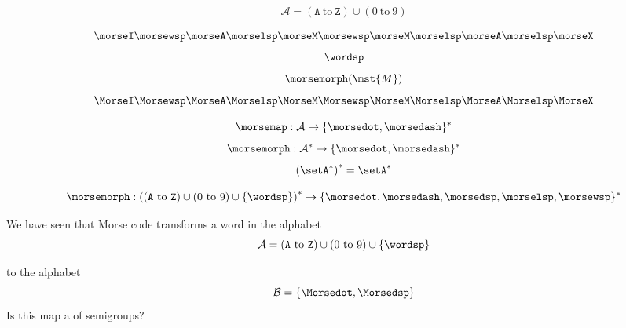 \begin{forslides}
\begin{equation} \label{eq:morse-alphabet-0}
\mathcal{A} = (\texttt{A} \ \text{to}\ \texttt{Z}) \cup (0 \ \text{to}\ 9)
\end{equation}

\begin{equation}\label{eq:IAMMAX}
      \morseI \morsewsp \morseA \morselsp \morseM \morsewsp \morseM \morselsp \morseA \morselsp \morseX
  \end{equation}
\begin{equation}\label{eq:wordsp}
      \wordsp
  \end{equation}
\begin{equation}\label{eq:morsem}
      \morsemorph(\mst{M})
  \end{equation}
\begin{equation}\label{eq:IAMMAXsignal}
      \MorseI \Morsewsp \MorseA \Morselsp \MorseM \Morsewsp \MorseM \Morselsp \MorseA \Morselsp \MorseX
  \end{equation}


\begin{equation} \label{eq:morsemap}
\morsemap : \mathcal{A} \to  \{\morsedot, \morsedash\}^*
\end{equation}
\begin{equation} \label{eq:morsemorph}
\morsemorph : \mathcal{A}^* \to   \{\morsedot, \morsedash\}^*
\end{equation}
\begin{equation} \label{eq:moresemapnote}
\left(\setA^*\right)^*= \setA^*
\end{equation}


\begin{equation} \label{eq:morsemorph2}
\morsemorph :
 \left(
(\texttt{A} \ \text{to}\ \texttt{Z}) \cup (0 \ \text{to}\ 9) \cup \{\wordsp\}
\right)^*
 \to   \{ \morsedot,  \morsedash,  \morsedsp,  \morselsp, \morsewsp \}^*
\end{equation}



\end{forslides}
\begin{exercise}
We have seen that Morse code transforms a word in the alphabet
\begin{equation} \label{eq:morse-alphabet-ext}
\mathcal{A} = (\texttt{A} \ \text{to}\ \texttt{Z}) \cup (0 \ \text{to}\ 9) \cup \{\wordsp\}
\end{equation}

to the alphabet
\begin{equation}
\mathcal{B} = \{\Morsedot, \Morsedsp\}
\end{equation}
Is this map a \whomo of semigroups?
\end{exercise}

